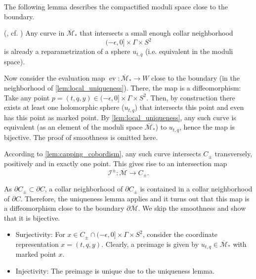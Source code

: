 The following lemma describes the compactified moduli space close to the boundary.
\begin{lemma}(\cite[Lemma 6.3]{BGM22}, cf. \cite[page 334]{MNW13})\label{lem:local_uniqueness}
    Any curve in $\overline{\mathcal M}_*$ that intersects a small enough collar neighborhood
    \[
        (-\epsilon, 0] \times \Gamma \times S^2
    \]
    is already a reparametrization of a sphere $u_{t,q}$ (i.e. equivalent in the moduli space).
\end{lemma}

Now consider the evaluation map $\operatorname{ev}\colon \overline{\mathcal M}_* \to W$ close to the boundary (in the neighborhood of \cref{lem:local_uniqueness}).
There, the map is a diffeomorphism: Take any point $p  = (t, q, y) \in (-\epsilon, 0] \times \Gamma \times S^2$. 
Then, by construction there exists at least one holomorphic sphere ($u_{t,q}$) that intersects this point
and even has this point as marked point.
By \cref{lem:local_uniqueness}, any such curve is equivalent (as an element of the moduli space $\overline{\mathcal M}_*$) to $u_{t,q}$, hence the map is bijective.
The proof of smoothness is omitted here.

According to \cref{lem:capping_cobordism}, any such curve intersects $C_\pm$ transversely, positively and in exactly one point.
This gives rise to an intersection map
\[
    \mathcal{I}^\pm\colon \overline{\mathcal{M}} \to C_\pm.
\]

As $\partial C_\pm \subset \partial C$, a collar neighborhood of $\partial C_\pm$ is contained in a collar neighborhood of $\partial C$.
Therefore, the uniqueness lemma applies and it turns out that this map is a diffeomorphism close to the boundary $\partial \overline{\mathcal M}$.
We skip the smoothness and show that it is bijective.
\begin{itemize}
    \item Surjectivity: For $x \in C_\pm \cap (-\epsilon, 0] \times \Gamma \times S^2$, consider the coordinate representation $x = (t, q, y)$.
    Clearly, a preimage is given by $u_{t,q} \in \overline{\mathcal M}_*$ with marked point $x$. 
    \item Injectivity: The preimage is unique due to the uniqueness lemma.
\end{itemize}